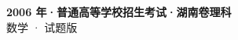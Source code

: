 \documentclass[zihao=-4, a4paper]{ctexart}
\begin{document}
\begin{center}
  {\Large\bfseries 2006 年·普通高等学校招生考试·湖南卷理科}\\[4pt]
  {\large 数学 · 试题版}
\end{center}
\medskip
{}

\end{document}
